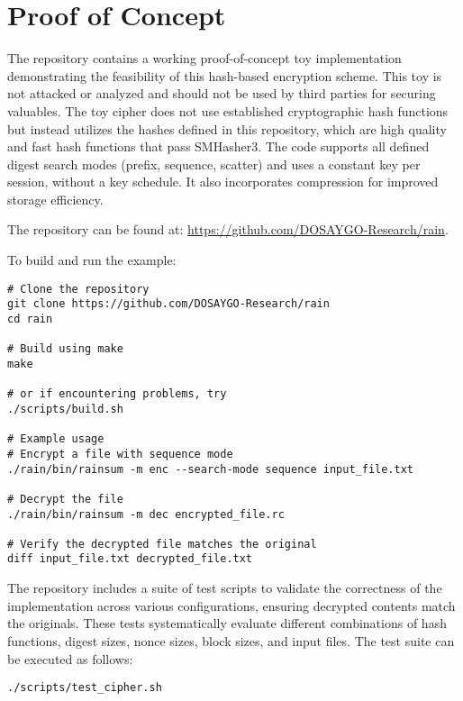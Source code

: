 \documentclass[11pt,a4paper]{article}
\begin{document}
\section*{Proof of Concept}
The repository contains a working proof-of-concept toy implementation demonstrating the feasibility of this hash-based encryption scheme. This toy is not attacked or analyzed and should not be used by third parties for securing valuables. The toy cipher does not use established cryptographic hash functions but instead utilizes the hashes defined in this repository, which are high quality and fast hash functions that pass SMHasher3. The code supports all defined digest search modes (prefix, sequence, scatter) and uses a constant key per session, without a key schedule. It also incorporates compression for improved storage efficiency.

The repository can be found at: \url{https://github.com/DOSAYGO-Research/rain}.

To build and run the example:
\begin{verbatim}
# Clone the repository
git clone https://github.com/DOSAYGO-Research/rain
cd rain

# Build using make
make

# or if encountering problems, try
./scripts/build.sh 

# Example usage
# Encrypt a file with sequence mode
./rain/bin/rainsum -m enc --search-mode sequence input_file.txt

# Decrypt the file
./rain/bin/rainsum -m dec encrypted_file.rc

# Verify the decrypted file matches the original
diff input_file.txt decrypted_file.txt
\end{verbatim}

The repository includes a suite of test scripts to validate the correctness of the implementation across various configurations, ensuring decrypted contents match the originals. These tests systematically evaluate different combinations of hash functions, digest sizes, nonce sizes, block sizes, and input files. The test suite can be executed as follows:
\begin{verbatim}
./scripts/test_cipher.sh
\end{verbatim}
\end{document}
